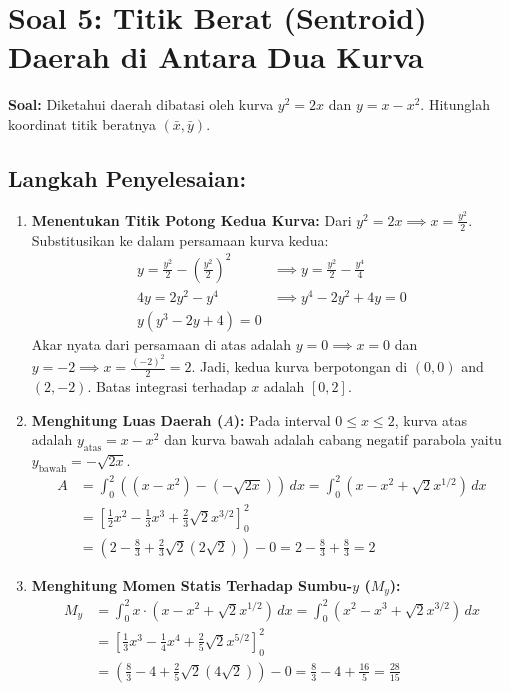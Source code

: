 \documentclass[11pt,a4paper]{article}
\begin{document}
\newpage

\section*{Soal 5: Titik Berat (Sentroid) Daerah di Antara Dua Kurva}
\textbf{Soal:} Diketahui daerah dibatasi oleh kurva $y^2 = 2x$ dan $y = x - x^2$. Hitunglah koordinat titik beratnya $(\bar{x}, \bar{y})$.

\subsection*{Langkah Penyelesaian:}
\begin{enumerate}
  \item \textbf{Menentukan Titik Potong Kedua Kurva:}
  Dari $y^2 = 2x \implies x = \frac{y^2}{2}$. Substitusikan ke dalam persamaan kurva kedua:
  \begin{align*}
    y = \frac{y^2}{2} - \left(\frac{y^2}{2}\right)^2 &\implies y = \frac{y^2}{2} - \frac{y^4}{4} \\
    4y = 2y^2 - y^4 &\implies y^4 - 2y^2 + 4y = 0 \\
    y(y^3 - 2y + 4) = 0
  \end{align*}
  Akar nyata dari persamaan di atas adalah $y = 0 \implies x = 0$ dan $y = -2 \implies x = \frac{(-2)^2}{2} = 2$.
  Jadi, kedua kurva berpotongan di $(0,0)$ and $(2,-2)$. Batas integrasi terhadap $x$ adalah $[0, 2]$.

  \item \textbf{Menghitung Luas Daerah ($A$):}
  Pada interval $0 \leq x \leq 2$, kurva atas adalah $y_{\text{atas}} = x - x^2$ dan kurva bawah adalah cabang negatif parabola yaitu $y_{\text{bawah}} = -\sqrt{2x}$.
  \begin{align*}
    A &= \int_{0}^{2} \left( (x - x^2) - (-\sqrt{2x}) \right) \, dx = \int_{0}^{2} (x - x^2 + \sqrt{2}x^{1/2}) \, dx \\
    &= \left[ \frac{1}{2}x^2 - \frac{1}{3}x^3 + \frac{2}{3}\sqrt{2}x^{3/2} \right]_{0}^{2} \\
    &= \left( 2 - \frac{8}{3} + \frac{2}{3}\sqrt{2}(2\sqrt{2}) \right) - 0 = 2 - \frac{8}{3} + \frac{8}{3} = 2
  \end{align*}

  \item \textbf{Menghitung Momen Statis Terhadap Sumbu-$y$ ($M_y$):}
  \begin{align*}
    M_y &= \int_{0}^{2} x \cdot (x - x^2 + \sqrt{2}x^{1/2}) \, dx = \int_{0}^{2} (x^2 - x^3 + \sqrt{2}x^{3/2}) \, dx \\
    &= \left[ \frac{1}{3}x^3 - \frac{1}{4}x^4 + \frac{2}{5}\sqrt{2}x^{5/2} \right]_{0}^{2} \\
    &= \left( \frac{8}{3} - 4 + \frac{2}{5}\sqrt{2}(4\sqrt{2}) \right) - 0 = \frac{8}{3} - 4 + \frac{16}{5} = \frac{28}{15}
  \end{align*}


\end{enumerate}
\end{document}
